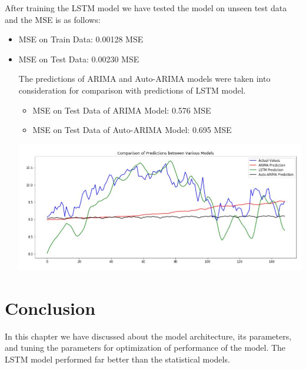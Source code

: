 After training the LSTM model we have tested the model on unseen test data and the MSE is as follows:
\begin{itemize}
\item MSE on Train Data: 0.00128 MSE
\item MSE on Test Data: 0.00230 MSE

The predictions of ARIMA and Auto-ARIMA models were taken into consideration for comparison with predictions of LSTM model. 
\begin{itemize}
\item MSE on Test Data of ARIMA Model:  0.576 MSE
\item MSE on Test Data of Auto-ARIMA Model:  0.695 MSE
\end{itemize}
				\begin{center}
				\includegraphics[width=\linewidth]{figures/Comp-ARIMA-LSTM.jpg}	
				\label{fig: Comparison of Prediction between ARIMA Model and LSTM Model with Actual Values}
				\end{center}
\end{itemize}
\section{Conclusion }

In this chapter we have discussed about the model architecture, its parameters, and tuning the parameters for optimization of performance of the model. The LSTM model performed far better than the statistical models.
